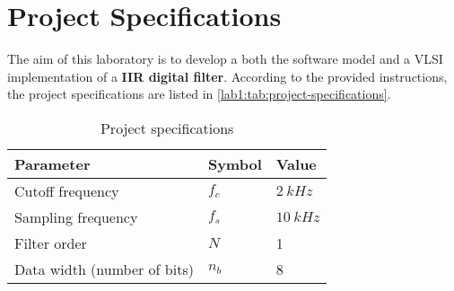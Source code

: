 \section{Project Specifications}
The aim of this laboratory is to develop a both the software model and a VLSI implementation of a \textbf{IIR digital filter}. According to the provided instructions, the project specifications are listed in \autoref{lab1:tab:project-specifications}.
\begin{table}[htbp]
	\center
	\begin{tabular}{|l l l|}
		\hline
        \textbf{Parameter} & \textbf{Symbol} & \textbf{Value} \\ \hline
        Cutoff frequency & $f_c$ & $\SI{2}{kHz}$ \\ \hline
        Sampling frequency & $f_s$ & $\SI{10}{kHz}$ \\ \hline
        Filter order & $N$ & 1 \\ \hline
        Data width (number of bits) & $n_b$ & 8 \\
		\hline
	\end{tabular}
	\caption{Project specifications}
	\label{lab1:tab:project-specifications}
\end{table}
